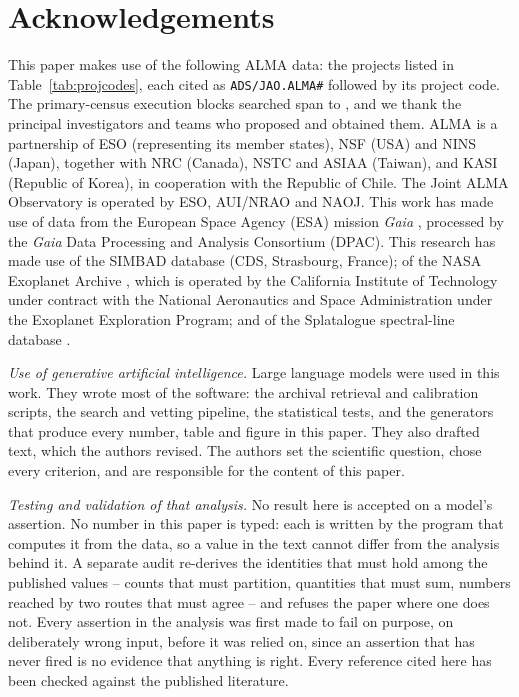 \section*{Acknowledgements}
This paper makes use of the following ALMA data: the \NProjCodes{} projects
listed in Table~\ref{tab:projcodes}, each cited as \texttt{ADS/JAO.ALMA\#}
followed by its project code. The \NEB{} primary-census execution blocks
searched span \PrEbDateFirst{} to \PrEbDateLast{}, and we thank the principal
investigators and teams who proposed and obtained
them.\ProjCodeUnresClause{} ALMA is a partnership of ESO
(representing its member states), NSF (USA) and NINS (Japan), together with NRC
(Canada), NSTC and ASIAA (Taiwan), and KASI (Republic of Korea), in cooperation
with the Republic of Chile. The Joint ALMA Observatory is operated by ESO,
AUI/NRAO and NAOJ. This work has made use of data from the European Space
Agency (ESA) mission {\it Gaia} \citep{GaiaDR3}, processed by the {\it Gaia}
Data Processing and Analysis Consortium (DPAC). This research has made use
of the SIMBAD database \citep{SIMBAD2000} (CDS, Strasbourg, France); of the
NASA Exoplanet Archive \citep{NEA2013}, which is operated by the California
Institute of Technology under contract with the National Aeronautics and
Space Administration under the Exoplanet Exploration Program; and of the
Splatalogue spectral-line database \citep{Splatalogue2007}.

\emph{Use of generative artificial intelligence.} Large language models were
used in this work. They wrote most of the software: the archival retrieval and
calibration scripts, the search and vetting pipeline, the statistical tests,
and the generators that produce every number, table and figure in this paper.
They also drafted text, which the authors revised. The authors set the
scientific question, chose every criterion, and are responsible for the
content of this paper.

\emph{Testing and validation of that analysis.} No result here is accepted
on a model's assertion. No number in this paper is typed: each is written by
the program that computes it from the data, so a value in the text cannot
differ from the analysis behind it. A separate audit re-derives the
identities that must hold among the published values -- counts that must
partition, quantities that must sum, numbers reached by two routes that must
agree -- and refuses the paper where one does not. Every assertion in the
analysis was first made to fail on purpose, on deliberately wrong input,
before it was relied on, since an assertion that has never fired is no
evidence that anything is right. Every reference cited here has been checked
against the published literature.

